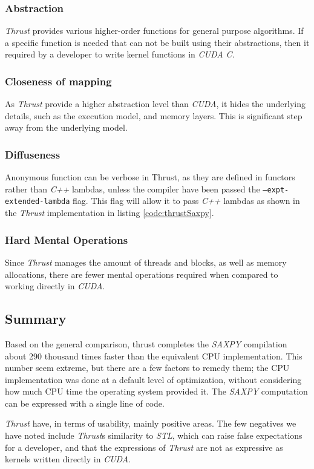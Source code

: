\subsubsection[*]{Abstraction}
\textit{Thrust} provides various higher-order functions for general purpose algorithms. If a specific function is needed that can not be built using their abstractions, then it required by a developer to write kernel functions in \textit{CUDA C}. 

\subsubsection[*]{Closeness of mapping}
As \textit{Thrust} provide a higher abstraction level than \textit{CUDA}, it hides the underlying details, such as the execution model, and memory layers. This is significant step away from the underlying model.

\subsubsection[*]{Diffuseness}
Anonymous function can be verbose in Thrust, as they are defined in functors rather than \textit{C++} lambdas, unless the compiler have been passed the \texttt{--expt-extended-lambda} flag. This flag will allow it to pass \textit{C++} lambdas as shown in the \textit{Thrust} implementation in listing \ref{code:thrustSaxpy}.

\subsubsection[*]{Hard Mental Operations}
Since \textit{Thrust} manages the amount of threads and blocks, as well as memory allocations, there are fewer mental operations required when compared to working directly in \textit{CUDA}. 

\subsection{Summary}\label{sec:thrustEvelSum}
Based on the general comparison, thrust completes the \textit{SAXPY} compilation about 290 thousand times faster than the equivalent CPU implementation. This number seem extreme, but there are a few factors to remedy them; the CPU implementation was done at a default level of optimization, without considering how much CPU time the operating system provided it. The \textit{SAXPY} computation can be expressed with a single line of code.

\textit{Thrust} have, in terms of usability, mainly positive areas. The few negatives we have noted include \textit{Thrust}s similarity to \textit{STL}, which can raise false expectations for a developer, and that the expressions of \textit{Thrust} are not as expressive as kernels written directly in \textit{CUDA}. 
